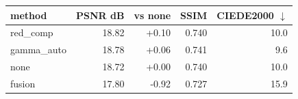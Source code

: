 \begin{tabular}{lrrrr}
\toprule
method & PSNR dB & vs none & SSIM & CIEDE2000 $\downarrow$ \\
\midrule
red\_comp & 18.82 & +0.10 & 0.740 & 10.0 \\
gamma\_auto & 18.78 & +0.06 & 0.741 & 9.6 \\
none & 18.72 & +0.00 & 0.740 & 10.0 \\
fusion & 17.80 & -0.92 & 0.727 & 15.9 \\
\bottomrule
\end{tabular}

